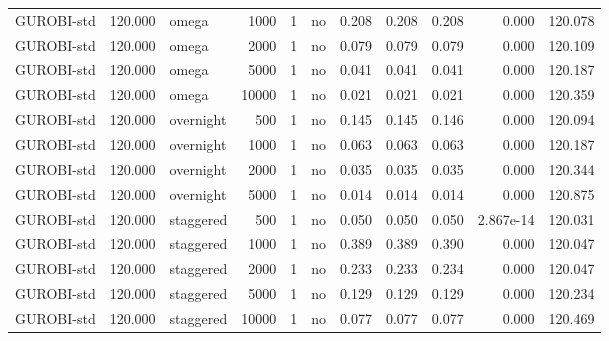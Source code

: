 \begin{table}[htbp]
\begin{tabular}{lrlrrlrrrrr}
GUROBI-std & 120.000 & omega & 1000 & 1 & no & 0.208 & 0.208 & 0.208 & 0.000 & 120.078 \\
GUROBI-std & 120.000 & omega & 2000 & 1 & no & 0.079 & 0.079 & 0.079 & 0.000 & 120.109 \\
GUROBI-std & 120.000 & omega & 5000 & 1 & no & 0.041 & 0.041 & 0.041 & 0.000 & 120.187 \\
GUROBI-std & 120.000 & omega & 10000 & 1 & no & 0.021 & 0.021 & 0.021 & 0.000 & 120.359 \\
GUROBI-std & 120.000 & overnight & 500 & 1 & no & 0.145 & 0.145 & 0.146 & 0.000 & 120.094 \\
GUROBI-std & 120.000 & overnight & 1000 & 1 & no & 0.063 & 0.063 & 0.063 & 0.000 & 120.187 \\
GUROBI-std & 120.000 & overnight & 2000 & 1 & no & 0.035 & 0.035 & 0.035 & 0.000 & 120.344 \\
GUROBI-std & 120.000 & overnight & 5000 & 1 & no & 0.014 & 0.014 & 0.014 & 0.000 & 120.875 \\
GUROBI-std & 120.000 & staggered & 500 & 1 & no & 0.050 & 0.050 & 0.050 & 2.867e-14 & 120.031 \\
GUROBI-std & 120.000 & staggered & 1000 & 1 & no & 0.389 & 0.389 & 0.390 & 0.000 & 120.047 \\
GUROBI-std & 120.000 & staggered & 2000 & 1 & no & 0.233 & 0.233 & 0.234 & 0.000 & 120.047 \\
GUROBI-std & 120.000 & staggered & 5000 & 1 & no & 0.129 & 0.129 & 0.129 & 0.000 & 120.234 \\
GUROBI-std & 120.000 & staggered & 10000 & 1 & no & 0.077 & 0.077 & 0.077 & 0.000 & 120.469 \\
\bottomrule
\end{tabular}
\end{table}
